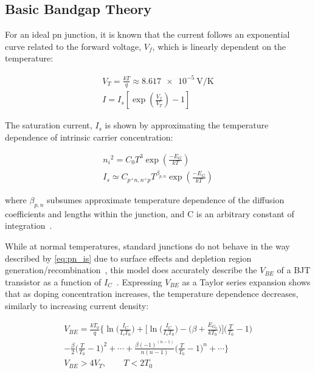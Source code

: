 \documentclass[journal]{IEEEtran}
\begin{document}
\subsection{Basic Bandgap Theory}

For an ideal pn junction, it is known that the current follows an exponential curve related to the forward voltage, \(V_f\), which is linearly dependent on the temperature:

\begin{gather}
    V_T = \frac{kT}{q} \approx \qty{8.617e-5}{\V\per\K} \label{eq:vt} \\
    I = I_s\left[\exp{\left(\frac{V_f}{V_T}\right)} - 1\right] \label{eq:pn_i}
\end{gather}

The saturation current, \(I_s\) is shown by approximating the temperature dependence of intrinsic carrier concentration:

\begin{gather}
    {n_i}^2 = C_0 T^3 \exp{\left(\frac{-E_G}{kT}\right)} \nonumber \\
    I_s \simeq C_{p^+n,n^+p} T^{\beta_{p,n}} \exp{\left(\frac{-E_G}{kT}\right)} \label{eq:pn_is}
\end{gather}

\noindent where \(\beta_{p,n}\) subsumes approximate temperature dependence of the diffusion coefficients and lengths within the junction, and C is an arbitrary constant of integration~\cite{Brugler1967}.

While at normal temperatures, standard junctions do not behave in the way described by \cref{eq:pn_is} due to surface effects and depletion region generation/recombination~\cite{Sah1957}, this model does accurately describe the \(V_{BE}\) of a BJT transistor as a function of \(I_C\)~\cite{Sah1962}. Expressing \(V_{BE}\) as a Taylor series expansion shows that as doping concentration increases, the temperature dependence decreases, similarly to increasing current density:

\begin{gather}
    V_{BE} = \frac{kT_0}{q} \Biggl\{ \ln{\biggl(\frac{I_C}{I_s T_0}\biggr)} + \Biggl[\ln{\biggl(\frac{I_C}{I_s T_0}\biggr)} - \biggl( \beta + \frac{E_{G_0}}{kT_0} \biggr) \Biggr] \biggl( \frac{T}{T_0} - 1 \biggr) \nonumber \\ - \frac{\beta}{2} \biggl( \frac{T}{T_0} - 1 \biggr)^2 + \cdots + \frac{\beta (-1)^{(n-1)}}{n(n-1)} \biggl( \frac{T}{T_0} - 1 \biggr)^n + \cdots \Biggr\}\label{eq:pn_taylor} \\
    V_{BE} > 4V_T,\qquad T < 2T_0 \nonumber
\end{gather}
\end{document}
